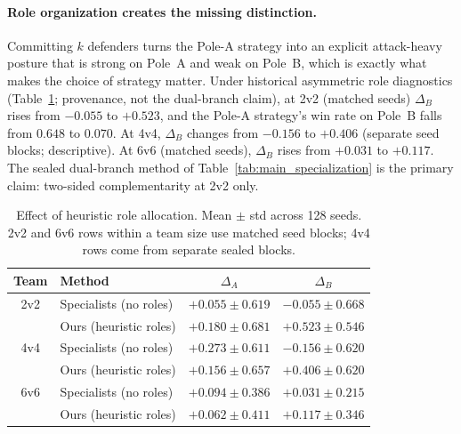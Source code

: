 \paragraph{Role organization creates the missing distinction.}
Committing \(k\) defenders turns the Pole-A strategy into an explicit
attack-heavy posture that is strong on Pole~A and weak on Pole~B, which is
exactly what makes the choice of strategy matter. Under historical
asymmetric role diagnostics (Table~\ref{tab:role_baseline_comparison};
provenance, not the dual-branch claim), at 2v2 (matched seeds)
\(\Delta_B\) rises from \(-0.055\) to \(+0.523\), and the Pole-A strategy's
win rate on Pole~B falls from \(0.648\) to \(0.070\). At 4v4,
\(\Delta_B\) changes from \(-0.156\) to \(+0.406\) (separate seed blocks;
descriptive). At 6v6 (matched seeds), \(\Delta_B\) rises from \(+0.031\) to
\(+0.117\). The sealed dual-branch method of
Table~\ref{tab:main_specialization} is the primary claim: two-sided
complementarity at 2v2 only.

\begin{table}[t]
\centering
\caption{Effect of heuristic role allocation. Mean $\pm$ std across 128
seeds. 2v2 and 6v6 rows within a team size use matched seed blocks; 4v4 rows
come from separate sealed blocks.}
\label{tab:role_baseline_comparison}
\footnotesize
\setlength{\tabcolsep}{3pt}
\begin{tabular}{@{}clcc@{}}
\hline
Team & Method & $\Delta_A$ & $\Delta_B$ \\
\hline
2v2 & Specialists (no roles) & $+0.055 \pm 0.619$ & $-0.055 \pm 0.668$ \\
    & Ours (heuristic roles) & $+0.180 \pm 0.681$ & $+0.523 \pm 0.546$ \\
\hline
4v4 & Specialists (no roles) & $+0.273 \pm 0.611$ & $-0.156 \pm 0.620$ \\
    & Ours (heuristic roles) & $+0.156 \pm 0.657$ & $+0.406 \pm 0.620$ \\
\hline
6v6 & Specialists (no roles) & $+0.094 \pm 0.386$ & $+0.031 \pm 0.215$ \\
    & Ours (heuristic roles) & $+0.062 \pm 0.411$ & $+0.117 \pm 0.346$ \\
\hline
\end{tabular}
\end{table}


